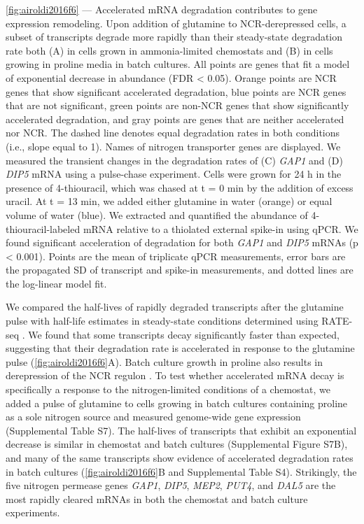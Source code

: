 \begin{framed}
\noindent
\autoref{fig:airoldi2016f6} ---
Accelerated mRNA degradation contributes
to gene expression remodeling. Upon addition of glutamine to
NCR-derepressed cells, a subset of transcripts degrade more rapidly
than their steady-state degradation rate both (A) in cells grown in
ammonia-limited chemostats and (B) in cells growing in proline media
in batch cultures. All points are genes that fit a model of
exponential decrease in abundance (FDR < 0.05). Orange points are NCR
genes that show significant accelerated degradation, blue points are
NCR genes that are not significant, green points are non-NCR genes
that show significantly accelerated degradation, and gray points are
genes that are neither accelerated nor NCR. The dashed line denotes
equal degradation rates in both conditions (i.e., slope equal to 1).
Names of nitrogen transporter genes are displayed. We measured the
transient changes in the degradation rates of (C) \textit{GAP1} and (D) \textit{DIP5}
mRNA using a pulse-chase experiment. Cells were grown for 24 h in the
presence of 4-thiouracil, which was chased at t = 0 min by the
addition of excess uracil. At t = 13 min, we added either glutamine in
water (orange) or equal volume of water (blue). We extracted and
quantified the abundance of 4-thiouracil-labeled mRNA relative to a
thiolated external spike-in using qPCR. We found significant
acceleration of degradation for both \textit{GAP1} and \textit{DIP5} mRNAs (p < 0.001).
Points are the mean of triplicate qPCR measurements, error bars are
the propagated SD of transcript and spike-in measurements, and dotted
lines are the log-linear model fit.  
\end{framed}

We compared the half-lives of rapidly degraded transcripts
after the glutamine pulse with half-life estimates in steady-state
conditions determined using RATE-seq 
\parencite{neymotin2014determination}. We found
that some transcripts decay significantly faster than expected,
suggesting that their degradation rate is accelerated in response to
the glutamine pulse (\autoref{fig:airoldi2016f6}A). 
Batch culture growth in proline also
results in derepression of the NCR regulon 
\parencite{godard2007effect}. To
test whether accelerated mRNA decay is specifically a response to the
nitrogen-limited conditions of a chemostat, we added a pulse of
glutamine to cells growing in batch cultures containing proline as a
sole nitrogen source and measured genome-wide gene expression
(Supplemental Table S7). The half-lives of transcripts that exhibit an
exponential decrease is similar in chemostat and batch cultures
(Supplemental Figure S7B), and many of the same transcripts show
evidence of accelerated degradation rates in batch cultures 
(\autoref{fig:airoldi2016f6}B
and Supplemental Table S4). Strikingly, the five nitrogen permease
genes \textit{GAP1}, \textit{DIP5}, \textit{MEP2}, 
\textit{PUT4}, and \textit{DAL5} are the most rapidly cleared
mRNAs in both the chemostat and batch culture experiments.  

